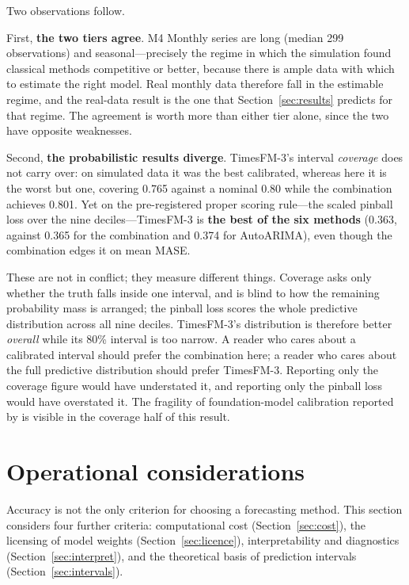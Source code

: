 \documentclass[11pt]{article}
\providecommand{\sectionref}[1]{Section~\ref{#1}}
\begin{document}
Two observations follow.

First, \textbf{the two tiers agree}. M4 Monthly series are long (median 299 observations) and
seasonal---precisely the regime in which the simulation found classical methods competitive or
better, because there is ample data with which to estimate the right model. Real monthly data
therefore fall in the estimable regime, and the real-data result is the one that
\sectionref{sec:results} predicts for that regime. The agreement is worth more than either tier alone, since the two have opposite
weaknesses.

Second, \textbf{the probabilistic results diverge}.
TimesFM-3's interval \emph{coverage} does not carry over: on simulated data it was the best
calibrated, whereas here it is the worst but one, covering 0.765 against a nominal 0.80 while the
combination achieves 0.801. Yet on the pre-registered proper scoring rule---the scaled pinball
loss over the nine deciles---TimesFM-3 is \textbf{the best of the six methods} (0.363, against
0.365 for the combination and 0.374 for AutoARIMA), even though the combination edges it on mean
MASE.

These are not in conflict; they measure different things. Coverage asks only whether the truth
falls inside one interval, and is blind to how the remaining probability mass is arranged; the
pinball loss scores the whole predictive distribution across all nine deciles. TimesFM-3's
distribution is therefore better \emph{overall} while its 80\% interval is too narrow. A reader
who cares about a calibrated interval should prefer the combination here; a reader who cares
about the full predictive distribution should prefer TimesFM-3. Reporting only the coverage
figure would have understated it, and reporting only the pinball loss would have overstated it.
The fragility of foundation-model calibration reported by \citet{adler2026calibrated} is visible
in the coverage half of this result.

\section{Operational considerations}
\label{sec:operational}

Accuracy is not the only criterion for choosing a forecasting method. This section considers four
further criteria: computational cost (\sectionref{sec:cost}), the licensing of model weights
(\sectionref{sec:licence}), interpretability and diagnostics (\sectionref{sec:interpret}), and
the theoretical basis of prediction intervals (\sectionref{sec:intervals}).
\end{document}
